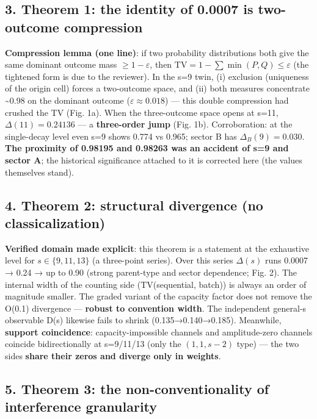 \documentclass[
]{article}
\begin{document}
\subsection{3. Theorem 1: the identity of 0.0007 is two-outcome
compression}\label{theorem-1-the-identity-of-0.0007-is-two-outcome-compression}

\textbf{Compression lemma (one line)}: if two probability distributions
both give the same dominant outcome mass \(\ge1-\varepsilon\), then
\(\mathrm{TV}=1-\sum\min(P,Q)\le\varepsilon\) (the tightened form is due
to the reviewer). In the s=9 twin, (i) exclusion (uniqueness of the
origin cell) forces a two-outcome space, and (ii) both measures
concentrate \textasciitilde0.98 on the dominant outcome
(\(\varepsilon\approx0.018\)) --- this double compression had crushed
the TV (Fig. 1a). When the three-outcome space opens at s=11,
\(\Delta(11)=0.24136\) --- a \textbf{three-order jump} (Fig. 1b).
Corroboration: at the single-decay level even s=9 shows 0.774 vs 0.965;
sector B has \(\Delta_B(9)=0.030\). \textbf{The proximity of 0.98195 and
0.98263 was an accident of s=9 and sector A}; the historical
significance attached to it is corrected here (the values themselves
stand).

\subsection{4. Theorem 2: structural divergence (no
classicalization)}\label{theorem-2-structural-divergence-no-classicalization}

\textbf{Verified domain made explicit}: this theorem is a statement at
the exhaustive level for \(s\in\{9,11,13\}\) (a three-point series).
Over this series \(\Delta(s)\) runs 0.0007 → 0.24 → up to 0.90 (strong
parent-type and sector dependence; Fig. 2). The internal width of the
counting side (TV(sequential, batch)) is always an order of magnitude
smaller. The graded variant of the capacity factor does not remove the
O(0.1) divergence --- \textbf{robust to convention width}. The
independent general-s observable D(s) likewise fails to shrink
(0.135→0.140→0.185). Meanwhile, \textbf{support coincidence}:
capacity-impossible channels and amplitude-zero channels coincide
bidirectionally at s=9/11/13 (only the \((1,1,s{-}2)\) type) --- the two
sides \textbf{share their zeros and diverge only in weights}.

\subsection{5. Theorem 3: the non-conventionality of interference
granularity}\label{theorem-3-the-non-conventionality-of-interference-granularity}
\end{document}
